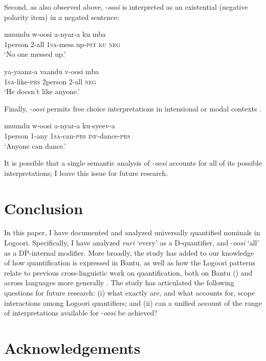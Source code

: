 \documentclass[output=paper]{langsci/langscibook}
\begin{document}
  Second, as also observed above, -\textit{oosi} is interpreted as an existential (negative polarity item) in a negated sentence:  

\ea 
\gll muundu  w-oosi    a-nyar-a    ku  mba  \\
     1person  2-all    1\textsc{sa}-mess.up-\textsc{pst}  \textsc{ku}  \textsc{neg}\\
\glt ‘No one messed up.’        
\z

\ea
\gll ya-yaanz-a  vaandu   v-oosi    mba \\
     1\textsc{sa}-like-\textsc{prs}  2person     2-all    \textsc{neg}\\
\glt ‘He doesn't like anyone.’
\z

  Finally, -\textit{oosi} permits free choice interpretations in intensional or modal contexts .

\ea
\gll muundu  w-oosi    a-nyar-a  ku-syeev-a\\
     1person  1-any    1\textsc{sa}-can-\textsc{prs}  \textsc{inf-}dance-\textsc{prs} \\
\glt ‘Anyone can dance.’
\z

It is possible that a single semantic analysis of -\textit{oosi} accounts for all of its possible interpretations; I leave this issue for future research. 

\section{Conclusion}

In this paper, I have documented and analyzed universally quantified nominals in Logoori. Specifically, I have analyzed \textit{vuri} ‘every’ as a D-quantifier, and -\textit{oosi} ‘all’ as a DP-internal modifier. More broadly, the study has added to our knowledge of how quantification is expressed in Bantu, as well as how the Logoori patterns relate to previous cross-linguistic work on quantification, both on Bantu (\citealt{ZerbianKrifka2008}) and across languages more generally \citep{Matthewson2013}. The study has articulated the following questions for future research: (i) what exactly are, and what accounts for, scope interactions among Logoori quantifiers; and (ii) can a unified account of the range of interpretations available for -\textit{oosi} be achieved?

\section*{Acknowledgements}
\end{document}
